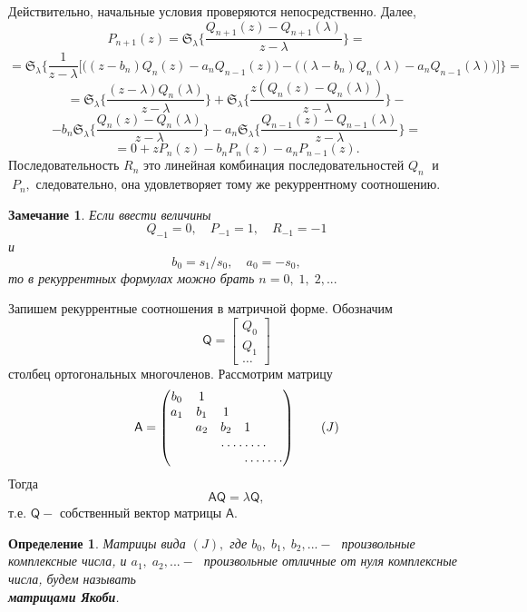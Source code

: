\documentclass[12pt,a4paper]{article}
\theoremstyle{plain}   \newtheorem{Pro}{Задача}
\newtheorem{Def}{Определение}
\newtheorem{Rem}{Замечание}
\begin{document}
Действительно, начальные условия проверяются непосредственно.
Далее,
$$
  P_{n+1}(z)=\mathfrak{S}_{\lambda} \biggl \{
  \frac{Q_{n+1}(z)-Q_{n+1}(\lambda )}{z-\lambda}
  \biggr \}=
$$
$$
  =\mathfrak{S}_{\lambda} \biggl \{
  \frac{1}{z-\lambda} \biggl [ \biggl (
  (z-b_n )Q_n (z)-a_n Q_{n-1}(z) \biggr ) -
  \biggl ( (\lambda -b_n ) Q_n (\lambda ) -
  a_n Q_{n-1} (\lambda ) \biggr ) \biggr ] \biggr \} =
$$
$$
  =\mathfrak{S}_{\lambda} \biggl \{
  \frac{(z-\lambda )Q_n (\lambda ) }{z-\lambda} \biggr \} +
  \mathfrak{S}_{\lambda} \biggl \{
  \frac{z(Q_n (z)-Q_n (\lambda ))}{z-\lambda } \biggr \} -
$$
$$
  -b_n \mathfrak{S}_{\lambda} \biggl \{
  \frac{Q_n (z) - Q_n (\lambda )}{z-\lambda} \biggr \} -
  a_n \mathfrak{S}_{\lambda} \biggl \{
  \frac{Q_{n-1}(z)-Q_{n-1}(\lambda )}{z-\lambda} \biggr \}=
$$
$$
  = 0 + zP_n (z) - b_n P_n (z) -a_n P_{n-1}(z).
$$
Последовательность
$ R_n $
это линейная комбинация последовательностей
$ Q_n \; $
и
$ \; P_n , $
следовательно, она удовлетворяет тому же рекуррентному соотношению.
\\
$ \; $
\begin{Rem}
Если ввести величины
$$
  Q_{-1}=0, \quad P_{-1}=1, \quad R_{-1}=-1
$$
и
$$
  b_0 =s_1 /s_0 , \quad a_0 =-s_0 ,
$$
то в рекуррентных формулах можно брать
$ n=0, \; 1, \; 2,... $
\end{Rem}
$ \; $
\\

Запишем рекуррентные соотношения в матричной форме.
Обозначим
\begin{equation*}
  \mathsf{Q}=
    \begin{bmatrix}
	  Q_0 \\
	  Q_1 \\
	  \dots
	\end{bmatrix}
\end{equation*}
столбец ортогональных многочленов. Рассмотрим матрицу
\begin{equation*}
  \mathsf{A}=
    \begin{pmatrix}
	  b_0 & 1 & \; & \; & \; & \; \\
	  a_1 & b_1 & 1 & \; & \; & \; \\
	  \; & a_2 & b_2 & 1 & \; & \; \\
	  \; & \; & \hdotsfor{3} & \; \\
	  \; & \; & \; & \hdotsfor{3}
	\end{pmatrix}
  \qquad (J)
\end{equation*}
Тогда
$$
  \mathsf{A} \mathsf{Q} = \lambda \mathsf{Q},
$$
т.е.
$ \mathsf{Q} - $
собственный вектор матрицы
$ \mathsf{A}. $
\begin{Def}
Матрицы вида
$ (J) , $
где
$ b_0 , \; b_1 , \; b_2 ,... - \; $
произвольные комплексные числа, и
$ a_1 , \; a_2 ,... - \; $
произвольные отличные от нуля комплексные числа,
будем называть\\
{\bfseries матрицами Якоби}.
\end{Def}
\newpage
\end{document}

